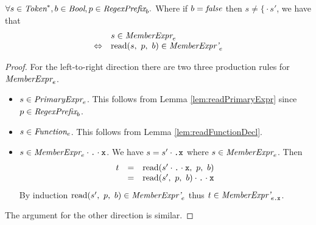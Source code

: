 \documentclass[preprint,10pt]{sigplanconf}
\begin{document}
\begin{lemma}\mbox{}

  \( \forall s \in \textit{Token}^*, b \in \textit{Bool}, p \in \textit{RegexPrefix}_b. \)
  Where if \( b = \textit{false} \) then \( s \not = \texttt{\{} \cdot s' \),
  we have that
  \[
  \begin{array}{rl}
  &s \in \textit{MemberExpr}_{e} 
  \\
  \Leftrightarrow&
  \textrm{read}(s,~p,~b) \in \textit{MemberExpr'}_{e} 
  \end{array}
  \]
\end{lemma}
\begin{proof}
  For the left-to-right direction there are two three production rules
  for \( \textit{MemberExpr}_{e} \).
  \begin{itemize}
  \item \( s \in \textit{PrimaryExpr}_{e} \). This follows from Lemma
    \ref{lem:readPrimaryExpr} since \( p \in \textit{RegexPrefix}_b \).
    
  \item \( s \in \textit{Function}_{e} \). This follows from Lemma
    \ref{lem:readFunctionDecl}.
    
  \item \( s \in \textit{MemberExpr}_{e} \cdot \texttt{.} \cdot \texttt{x} \). We have \(
    s = s' \cdot \texttt{.} \texttt{x} \) where \( s \in
    \textit{MemberExpr}_{e} \). Then
    \[
    \begin{array}{rcl}
      t &=& \textrm{read}(s' \cdot \texttt{.} \cdot \texttt{x},~p,~b)
      \\
      &=& \textrm{read}(s',~p,~b) \cdot \texttt{.} \cdot \texttt{x}
    \end{array}
    \]
    By induction \( \textrm{read}(s',~p,~b) \in \textit{MemberExpr'}_{e}
    \) thus \( t \in \textit{MemberExpr'}_{e\texttt{.\texttt{x}}} \).
  \end{itemize}
  
  The argument for the other direction is similar.
\end{proof}
\end{document}
